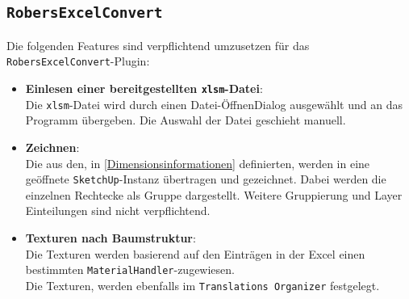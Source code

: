 \documentclass[a4paper,12pt]{article}
\newcommand{\robersexcelconvert}{\texttt{RobersExcelConvert}\xspace}
\newcommand{\assisttool}{\texttt{Translations Organizer}}
\newcommand{\sketchup}{\texttt{SketchUp}\xspace}
\begin{document}
		\subsection{\robersexcelconvert} \label{Pflichten-Nehmer-main}
			Die folgenden Features sind verpflichtend umzusetzen für das \robersexcelconvert-Plugin:
			\begin{itemize}
				\item \textbf{Einlesen einer bereitgestellten \texttt{xlsm}-Datei}:\label{Dimensionsinformationen}\\ %
					Die \texttt{xlsm}-Datei wird durch einen Datei-ÖffnenDialog ausgewählt und an das Programm übergeben. Die Auswahl der Datei geschieht manuell.
				\item \textbf{Zeichnen}: \label{zeichnen}\\
					Die aus den, in \ref{Dimensionsinformationen} definierten, werden in eine geöffnete \sketchup-Instanz übertragen und gezeichnet. Dabei werden die einzelnen Rechtecke als Gruppe dargestellt. Weitere Gruppierung und Layer Einteilungen sind nicht verpflichtend.
				\item \textbf{Texturen nach Baumstruktur}: \label{texturen}\\
					Die Texturen werden basierend auf den Einträgen in der Excel einen bestimmten \texttt{MaterialHandler}-zugewiesen.\\ Die Texturen, werden ebenfalls im \assisttool\xspace festgelegt.
			\end{itemize}
\end{document}
